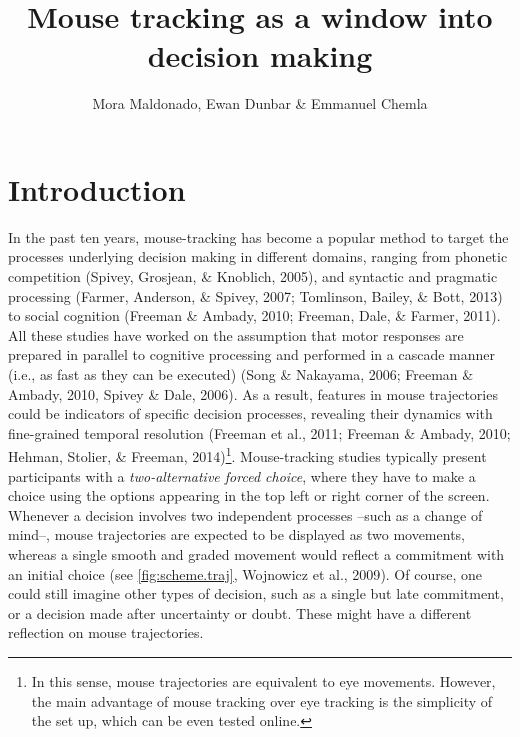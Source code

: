 \documentclass{article}
\title{Mouse tracking as a window into decision making}
\author{Mora Maldonado, Ewan Dunbar \& Emmanuel Chemla}
\newcommand{\addMM}[1]{{\leavevmode\color{red}#1}}
\begin{document}
\maketitle

\section{Introduction}

In the past ten years, mouse-tracking has become a popular method to target the processes underlying decision making in different domains, ranging from phonetic competition (Spivey, Grosjean, \& Knoblich, 2005), and syntactic and pragmatic processing (Farmer, Anderson, \& Spivey, 2007; Tomlinson, Bailey, \& Bott, 2013) to social cognition (Freeman \& Ambady, 2010; Freeman, Dale, \& Farmer, 2011). 
%
All these studies have worked on the assumption that motor responses are prepared in parallel to cognitive processing and performed in a cascade manner (i.e., as fast as they can be executed) (Song \& Nakayama, 2006; Freeman \& Ambady, 2010, Spivey \& Dale, 2006). 
%
As a result, features in mouse trajectories could be indicators of specific decision processes, revealing their dynamics with fine-grained temporal resolution (Freeman et al., 2011; Freeman \& Ambady, 2010; Hehman, Stolier, \& Freeman, 2014)\footnote{In this sense, mouse trajectories are equivalent to eye movements. However, the main advantage of mouse tracking over eye tracking is the simplicity of the set up, which can be even tested online.}. 
%
Mouse-tracking studies typically present participants with a \emph{two-alternative forced choice}, where they have to make a choice using the options appearing in the top left or right corner of the screen. Whenever a decision involves two independent processes --such as a change of mind--, mouse trajectories are expected to be displayed as two movements, whereas a single smooth and graded movement would reflect a commitment with an initial choice (see \ref{fig:scheme.traj}, \addMM{Wojnowicz et al., 2009}).
%
Of course, one could still imagine other types of decision, such as a single but late commitment, or a decision made after uncertainty or doubt. These might have a different reflection on mouse trajectories.
\end{document}
